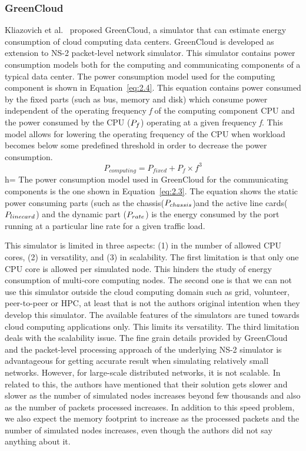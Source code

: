\subsubsection{GreenCloud}
Kliazovich et al.{\ }\cite{DBLP:journals/tjs/KliazovichBK12} proposed GreenCloud, a simulator that can estimate energy consumption of cloud computing data centers. GreenCloud is developed as extension to NS-2 packet-level network simulator. This simulator contains power consumption models both for the computing and communicating components of a typical data center. The power consumption model used for the computing component is shown in Equation~\ref{eq:2.4}. This equation contains power consumed by the fixed parts (such as bus, memory and disk) which consume power independent of the operating frequency \emph{f} of the computing component CPU and the power consumed by the CPU (\($$P_f$$\)) operating at a given frequency \emph{f}. This model allows for lowering the operating frequency of the CPU when workload becomes below some predefined threshold in order to decrease the power consumption. 
\begin{equation} \label{eq:2.4}
P_{computing} = P_{fixed} + P_f \times f^3
\end{equation}h=
The power consumption model used in GreenCloud for the communicating components is the one shown in Equation~\ref{eq:2.3}. The equation shows the static power consuming parts (such as the chassis(\($$P_{chassis}$$\))and the active line cards(\($$P_{linecard}$$\)) and the dynamic part (\($$P_{rate}$$\)) is the energy consumed by the port running at a particular line rate for a given traffic load. 

This simulator is limited in three aspects: (1) in the number of allowed CPU cores, (2) in versatility, and (3) in scalability. The first limitation is that only one CPU core is allowed per simulated node. This hinders the study of energy consumption of multi-core computing nodes. The second one is that we can not use this simulator outside the cloud computing domain such as grid, volunteer, peer-to-peer or HPC, at least that is not the authors original intention when they develop this simulator. The available features of the simulators are tuned towards cloud computing applications only. This limits its versatility. The third limitation deals with the scalability issue. The fine grain details provided by GreenCloud and the packet-level processing approach of the underlying NS-2 simulator is advantageous for getting accurate result when simulating relatively small networks. However, for large-scale distributed networks, it is not scalable. In related to this, the authors have mentioned that their solution gets slower and slower as the number of simulated nodes increases beyond few thousands and also as the number of packets processed increases. In addition to this speed problem, we also expect the memory footprint to increase as the processed packets and the number of simulated nodes increases, even though the authors did not say anything about it.  

